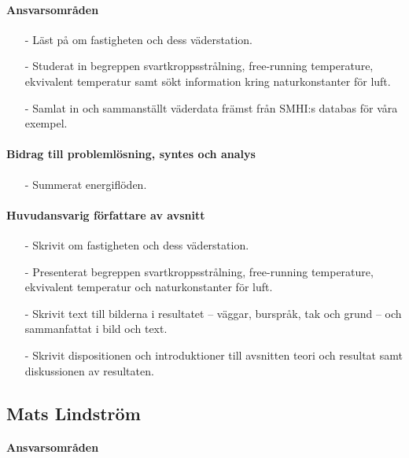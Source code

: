 \documentclass[12pt,a4paper]{article}
\begin{document}
\paragraph{Ansvarsområden}

\begin{itemize}
\item[-] Läst på om fastigheten och dess väderstation.
\item[-] Studerat in begreppen svartkroppsstrålning, free-running temperature, ekvivalent temperatur samt sökt information kring naturkonstanter för luft.
\item[-] Samlat in och sammanställt väderdata främst från SMHI:s databas för våra exempel.
\end{itemize}

\paragraph{Bidrag till problemlösning, syntes och analys}
\begin{itemize}
\item[-] Summerat energiflöden.
\end{itemize}

\paragraph{Huvudansvarig författare av avsnitt}
\begin{itemize}
\item[-] Skrivit om fastigheten och dess väderstation.
\item[-] Presenterat begreppen svartkroppsstrålning, free-running temperature, ekvivalent temperatur och naturkonstanter för luft.
\item[-] Skrivit text till bilderna i resultatet – väggar, burspråk, tak och grund – och sammanfattat i bild och text.
\item[-] Skrivit dispositionen och introduktioner till avsnitten teori och resultat samt diskussionen av resultaten.
\end{itemize}


\subsection*{Mats Lindström}

\paragraph{Ansvarsområden}
\end{document}
